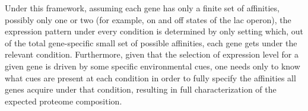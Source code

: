 Under this framework, assuming each gene has only a finite set of affinities, possibly only one or two (for example, on and off states of the lac operon), the expression pattern under every condition is determined by only setting which, out of the total gene-specific small set of possible affinities, each gene gets under the relevant condition.
Furthermore, given that the selection of expression level for a given gene is driven by some specific environmental cues, one needs only to know what cues are present at each condition in order to fully specify the affinities all genes acquire under that condition, resulting in full characterization of the expected proteome composition.
